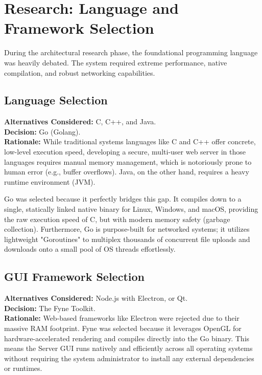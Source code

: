 \documentclass[12pt, a4paper]{article}
\begin{document}
\section{Research: Language and Framework Selection}
During the architectural research phase, the foundational programming language was heavily debated. The system required extreme performance, native compilation, and robust networking capabilities.

\subsection{Language Selection}
\textbf{Alternatives Considered:} C, C++, and Java.\\
\textbf{Decision:} Go (Golang).\\
\textbf{Rationale:} While traditional systems languages like C and C++ offer concrete, low-level execution speed, developing a secure, multi-user web server in those languages requires manual memory management, which is notoriously prone to human error (e.g., buffer overflows). Java, on the other hand, requires a heavy runtime environment (JVM). 

Go was selected because it perfectly bridges this gap. It compiles down to a single, statically linked native binary for Linux, Windows, and macOS, providing the raw execution speed of C, but with modern memory safety (garbage collection). Furthermore, Go is purpose-built for networked systems; it utilizes lightweight "Goroutines" to multiplex thousands of concurrent file uploads and downloads onto a small pool of OS threads effortlessly.

\subsection{GUI Framework Selection}
\textbf{Alternatives Considered:} Node.js with Electron, or Qt.\\
\textbf{Decision:} The Fyne Toolkit.\\
\textbf{Rationale:} Web-based frameworks like Electron were rejected due to their massive RAM footprint. Fyne was selected because it leverages OpenGL for hardware-accelerated rendering and compiles directly into the Go binary. This means the Server GUI runs natively and efficiently across all operating systems without requiring the system administrator to install any external dependencies or runtimes.

\newpage
\end{document}
